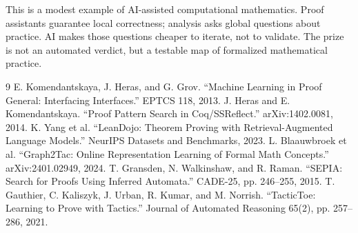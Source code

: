 \documentclass[11pt]{article}
\begin{document}
This is a modest example of AI-assisted computational mathematics.  Proof assistants guarantee
local correctness; analysis asks global questions about practice.  AI makes those questions
cheaper to iterate, not to validate.  The prize is not an automated verdict, but a testable map
of formalized mathematical practice.

\vfill
\begin{thebibliography}{9}\footnotesize
\setlength{\itemsep}{0pt}
 E. Komendantskaya, J. Heras, and G. Grov. ``Machine Learning in Proof General: Interfacing Interfaces.'' EPTCS 118, 2013.
 J. Heras and E. Komendantskaya. ``Proof Pattern Search in Coq/SSReflect.'' arXiv:1402.0081, 2014.
 K. Yang et al. ``LeanDojo: Theorem Proving with Retrieval-Augmented Language Models.'' NeurIPS Datasets and Benchmarks, 2023.
 L. Blaauwbroek et al. ``Graph2Tac: Online Representation Learning of Formal Math Concepts.'' arXiv:2401.02949, 2024.
 T. Gransden, N. Walkinshaw, and R. Raman. ``SEPIA: Search for Proofs Using Inferred Automata.'' CADE-25, pp. 246--255, 2015.
 T. Gauthier, C. Kaliszyk, J. Urban, R. Kumar, and M. Norrish. ``TacticToe: Learning to Prove with Tactics.'' Journal of Automated Reasoning 65(2), pp. 257--286, 2021.
\end{thebibliography}
\end{document}

